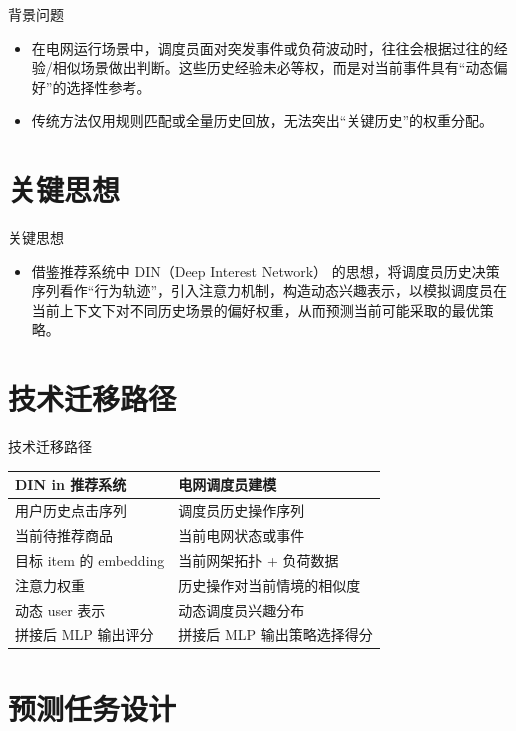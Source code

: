 \documentclass[11pt]{beamer}
\begin{document}
\begin{frame}{背景问题}
 \begin{itemize}
  \item 在电网运行场景中，调度员面对突发事件或负荷波动时，往往会根据过往的经验/相似场景做出判断。这些历史经验未必等权，而是对当前事件具有“动态偏好”的选择性参考。
  \item 传统方法仅用规则匹配或全量历史回放，无法突出“关键历史”的权重分配。
 \end{itemize}
\end{frame}

\section{关键思想}

\begin{frame}{关键思想}
 \begin{itemize}
  \item 借鉴推荐系统中 DIN（Deep Interest Network） 的思想，将调度员历史决策序列看作“行为轨迹”，引入注意力机制，构造动态兴趣表示，以模拟调度员在当前上下文下对不同历史场景的偏好权\cite{langchain2023framework}重，从而预测当前可能采取的最优策略。
 \end{itemize}
\end{frame}

\section{技术迁移路径}

\begin{frame}{技术迁移路径}
 \centering
 \begin{tabular}{ll}
  \toprule
  DIN in 推荐系统 & 电网调度员建模 \\
  \midrule
  用户历史点击序列 & 调度员历史操作序列 \\
  当前待推荐商品 & 当前电网状态或事件 \\
  目标 item 的 embedding & 当前网架拓扑 + 负荷数据 \\
  注意力权重 & 历史操作对当前情境的相似度 \\
  动态 user 表示 & 动态调度员兴趣分布 \\
  拼接后\cite{langchain2023framework} MLP 输出评分 & 拼接后 MLP 输出策略选择得分 \\
  \bottomrule
 \end{tabular}
\end{frame}

\section{预测任务设计}
\end{document}
